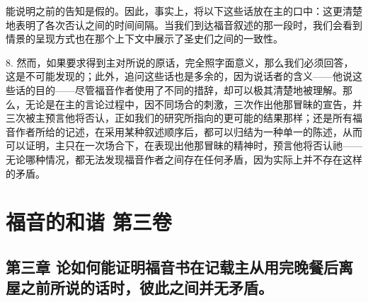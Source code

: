 能说明之前的告知是假的。因此，事实上，将以下这些话放在主的口中：这更清楚地表明了各次否认之间的时间间隔。当我们到达福音叙述的那一段时，我们会看到情景的呈现方式也在那个上下文中展示了圣史们之间的一致性。\par

8. 然而，如果要求得到主对所说的原话，完全照字面意义，那么我们必须回答，这是不可能发现的；此外，追问这些话也是多余的，因为说话者的含义——他说这些话的目的——尽管福音作者使用了不同的措辞，却可以极其清楚地被理解。那么，无论是在主的言论过程中，因不同场合的刺激，三次作出他那冒昧的宣告，并三次被主预言他将否认，正如我们的研究所指向的更可能的结果那样；还是所有福音作者所给的记述，在采用某种叙述顺序后，都可以归结为一种单一的陈述，从而可以证明，主只在一次场合下，在表现出他那冒昧的精神时，预言他将否认祂——无论哪种情况，都无法发现福音作者之间存在任何矛盾，因为实际上并不存在这样的矛盾。\par



\section{福音的和谐 第三卷}


\subsection{第三章 论如何能证明福音书在记载主从用完晚餐后离屋之前所说的话时，彼此之间并无矛盾。}

